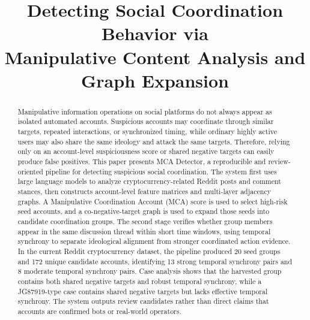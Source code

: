 \documentclass[conference]{IEEEtran}
\begin{document}
\title{Detecting Social Coordination Behavior via\\Manipulative Content Analysis and Graph Expansion}

\author{
}

\maketitle

\begin{abstract}
Manipulative information operations on social platforms do not always appear as isolated automated accounts. Suspicious accounts may coordinate through similar targets, repeated interactions, or synchronized timing, while ordinary highly active users may also share the same ideology and attack the same targets. Therefore, relying only on an account-level suspiciousness score or shared negative targets can easily produce false positives. This paper presents MCA Detector, a reproducible and review-oriented pipeline for detecting suspicious social coordination. The system first uses large language models to analyze cryptocurrency-related Reddit posts and comment stances, then constructs account-level feature matrices and multi-layer adjacency graphs. A Manipulative Coordination Account (MCA) score is used to select high-risk seed accounts, and a co-negative-target graph is used to expand those seeds into candidate coordination groups. The second stage verifies whether group members appear in the same discussion thread within short time windows, using temporal synchrony to separate ideological alignment from stronger coordinated action evidence. In the current Reddit cryptocurrency dataset, the pipeline produced 20 seed groups and 172 unique candidate accounts, identifying 13 strong temporal synchrony pairs and 8 moderate temporal synchrony pairs. Case analysis shows that the harvested group contains both shared negative targets and robust temporal synchrony, while a JG87919-type case contains shared negative targets but lacks effective temporal synchrony. The system outputs review candidates rather than direct claims that accounts are confirmed bots or real-world operators.
\end{abstract}
\end{document}

